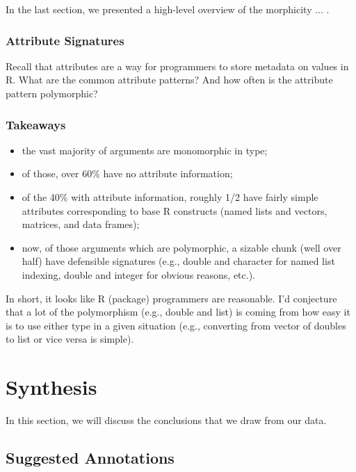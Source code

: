 \documentclass[acmsmall,10pt,review,anonymous]{acmart}\settopmatter{printfolios=true,printccs=false,printacmref=false}
\begin{document}
In the last section, we presented a high-level overview of the morphicity ... .

\subsubsection{Attribute Signatures}

Recall that attributes are a way for programmers to store metadata on values in R.
What are the common attribute patterns?
And how often is the attribute pattern polymorphic?

\subsubsection{Takeaways}

\begin{itemize}
    \item the vast majority of arguments are monomorphic in type;
    \item of those, over 60\% have no attribute information;
    \item of the 40\% with attribute information, roughly 1/2 have fairly
      simple attributes corresponding to base R constructs (named lists and
      vectors, matrices, and data frames);
    \item now, of those arguments which are polymorphic, a sizable chunk (well over half) have defensible signatures (e.g., double and character for named list indexing, double and integer for obvious reasons, etc.).
\end{itemize}

In short, it looks like R (package) programmers are reasonable.  I'd
conjecture that a lot of the polymorphism (e.g., double and list) is coming
from how easy it is to use either type in a given situation (e.g.,
converting from vector of doubles to list or vice versa is simple).

%
%
%
%
%
%
\section{Synthesis}

In this section, we will discuss the conclusions that we draw from our data.


%
%
\subsection{Suggested Annotations}

\end{document}
